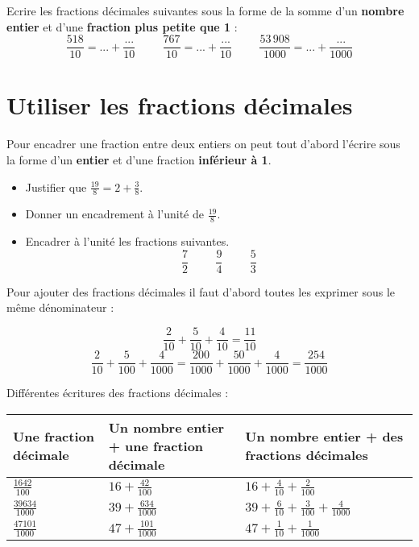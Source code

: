 \documentclass[a4paper,dvipsnames]{article}
\begin{document}
\begin{ExOApp}[]
Ecrire les fractions décimales suivantes sous la forme de la somme d'un \textbf{nombre entier} et d'une \textbf{fraction plus petite que 1} :
\[\frac{518}{10}=...+\frac{...}{10}\hspace{1cm}\frac{767}{10}=...+\frac{...}{10}\hspace{1cm}\frac{53\,908}{1000}=...+\frac{...}{1000}\]
\end{ExOApp}

\section{Utiliser les fractions décimales}

\begin{Mt}
Pour encadrer une fraction entre deux entiers on peut tout d'abord l'écrire sous la forme d'un \textbf{entier} et d'une fraction \textbf{inférieur à 1}.
\end{Mt}

\begin{ExOApp}[]
\begin{itemize}
\item Justifier que $\frac{19}{8}=2+\frac{3}{8}$.
\item Donner un encadrement à l'unité de $\frac{19}{8}$.
\item Encadrer à l'unité les fractions suivantes.
\[\frac{7}{2}\hspace{1cm}\frac{9}{4}\hspace{1cm}\frac{5}{3}\]
\end{itemize}
\end{ExOApp}

\begin{Mt}
Pour ajouter des fractions décimales il faut d'abord toutes les exprimer sous le même dénominateur :
\begin{Ex}
\[\frac{2}{10}+\frac{5}{10}+\frac{4}{10}=\frac{11}{10}\]
\[\frac{2}{10}+\frac{5}{100}+\frac{4}{1000}=\frac{200}{1000}+\frac{50}{1000}+\frac{4}{1000}=\frac{254}{1000}\]
\end{Ex}
\end{Mt}

\begin{Mt}
Différentes écritures des fractions décimales :
\begin{center}
\begin{tabular}{M{5cm}|M{5cm}|M{5cm}}
Une fraction décimale & Un nombre entier + une fraction décimale & Un nombre entier + des fractions décimales \\\hline\hline
$\frac{1642}{100}$ & $16+\frac{42}{100}$ & $16+\frac{4}{10}+\frac{2}{100}$ \\\hline
$\frac{39634}{1000}$ & $39+\frac{634}{1000}$ & $39+\frac{6}{10}+\frac{3}{100}+\frac{4}{1000}$ \\\hline
$\frac{47101}{1000}$ & $47+\frac{101}{1000}$ & $47+\frac{1}{10}+\frac{1}{1000}$ \\
\end{tabular}
\end{center}
\end{Mt}
\end{document}
